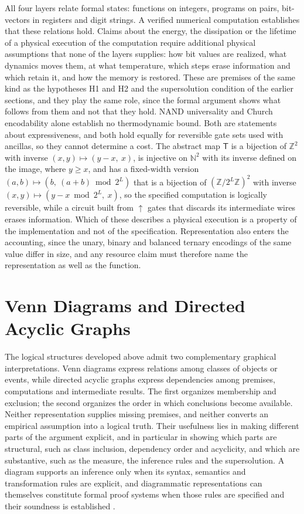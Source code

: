 \documentclass[11pt]{article}
\theoremstyle{definition}
\theoremstyle{remark}
\newcommand{\nand}{\uparrow}
\newcommand{\Tm}{\mathsf{T}}
\begin{document}
All four layers relate formal states: functions on integers, programs on pairs, bit-vectors in registers and digit strings. A verified numerical computation establishes that these relations hold. Claims about the energy, the dissipation or the lifetime of a physical execution of the computation require additional physical assumptions that none of the layers supplies: how bit values are realized, what dynamics moves them, at what temperature, which steps erase information and which retain it, and how the memory is restored. These are premises of the same kind as the hypotheses H1 and H2 and the supersolution condition of the earlier sections, and they play the same role, since the formal argument shows what follows from them and not that they hold. NAND universality and Church encodability alone establish no thermodynamic bound. Both are statements about expressiveness, and both hold equally for reversible gate sets used with ancillas, so they cannot determine a cost. The abstract map $\Tm$ is a bijection of $\mathbb{Z}^{2}$ with inverse $(x,y) \mapsto (y-x,\ x)$, is injective on $\mathbb{N}^{2}$ with its inverse defined on the image, where $y \ge x$, and has a fixed-width version $(a,b) \mapsto (b,\ (a+b) \bmod 2^{L})$ that is a bijection of $(\mathbb{Z}/2^{L}\mathbb{Z})^{2}$ with inverse $(x,y) \mapsto (y-x \bmod 2^{L},\ x)$, so the specified computation is logically reversible, while a circuit built from $\nand$ gates that discards its intermediate wires erases information. Which of these describes a physical execution is a property of the implementation and not of the specification. Representation also enters the accounting, since the unary, binary and balanced ternary encodings of the same value differ in size, and any resource claim must therefore name the representation as well as the function.

\section{Venn Diagrams and Directed Acyclic Graphs}
\label{sec:venn-dag}

The logical structures developed above admit two complementary graphical interpretations. Venn diagrams express relations among classes of objects or events, while directed acyclic graphs express dependencies among premises, computations and intermediate results. The first organizes membership and exclusion; the second organizes the order in which conclusions become available. Neither representation supplies missing premises, and neither converts an empirical assumption into a logical truth. Their usefulness lies in making different parts of the argument explicit, and in particular in showing which parts are structural, such as class inclusion, dependency order and acyclicity, and which are substantive, such as the measure, the inference rules and the supersolution. A diagram supports an inference only when its syntax, semantics and transformation rules are explicit, and diagrammatic representations can themselves constitute formal proof systems when those rules are specified and their soundness is established \cite{shin1995}.
\end{document}
